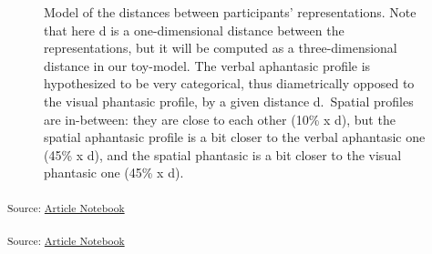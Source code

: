 \documentclass[
  authoryear]{elsarticle}
\begin{document}
\begin{figure}


\caption{\label{fig-diagram-intermediate}Model of the distances between
participants' representations. Note that here d is a one-dimensional
distance between the representations, but it will be computed as a
three-dimensional distance in our toy-model. The verbal aphantasic
profile is hypothesized to be very categorical, thus diametrically
opposed to the visual phantasic profile, by a given distance d.~Spatial
profiles are in-between: they are close to each other (10\% x d), but
the spatial aphantasic profile is a bit closer to the verbal aphantasic
one (45\% x d), and the spatial phantasic is a bit closer to the visual
phantasic one (45\% x d).}

\end{figure}%

\textsubscript{Source:
\href{https://m-delem.github.io/2499-similarity-manuscript/index.qmd.html}{Article
Notebook}}

\textsubscript{Source:
\href{https://m-delem.github.io/2499-similarity-manuscript/index.qmd.html}{Article
Notebook}}
\end{document}
